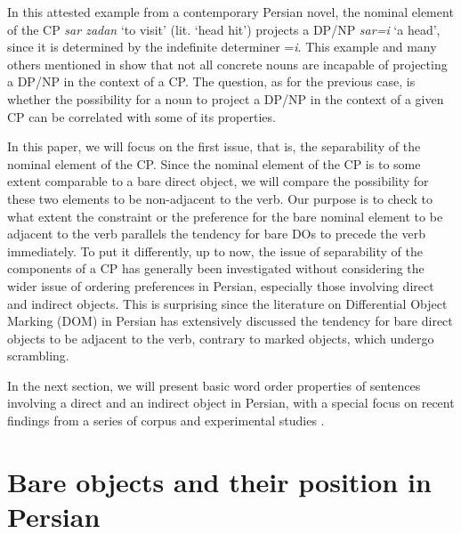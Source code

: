 \documentclass[output=paper]{langsci/langscibook}
\begin{document}
In this attested example from a contemporary Persian novel, the nominal element of the CP \textit{sar zadan} `to visit' (lit. `head hit') projects a DP/NP \textit{sar=i} `a head', since it is determined by the indefinite determiner =\textit{i}. This example and many others mentioned in \citet{Samvelian2012} show that not all concrete nouns are incapable of projecting a DP/NP in the context of a CP. The question, as for the previous case, is whether the possibility for a noun to project a DP/NP in the context of a given CP can be correlated with some of its properties.

In this paper, we will focus on the first issue, that is, the separability of the nominal element of the CP. Since the nominal element of the CP is to some extent comparable to a bare direct object, we will compare the possibility for these two elements to be non-adjacent to the verb. Our purpose is to check to what extent the constraint or the preference for the bare nominal element to be adjacent to the verb parallels the tendency for bare DOs to  precede the verb immediately. To put it differently, up to now, the issue of  separability of the components of a CP has generally been investigated without considering the wider issue of ordering preferences in Persian, especially those involving direct and indirect objects. This is surprising since the literature on Differential Object Marking (DOM) in Persian has extensively discussed the tendency for bare direct objects to be adjacent to the verb, contrary to marked objects, which undergo scrambling. 

In the next section, we will present basic word order properties of sentences involving a direct and an indirect object in Persian, with a special focus on recent findings from a series of corpus and experimental studies \citep{FaghiriPhd,FagSam2014,FagSamHem2014,FagSamHem2018}.



\section{Bare objects and their position in Persian}\label{Sec:WO}
\end{document}
